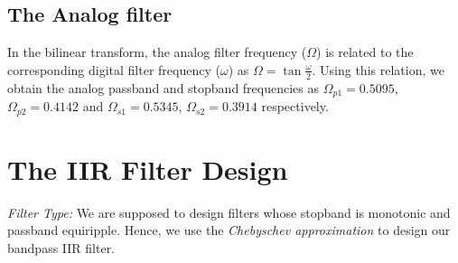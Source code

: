 \documentclass{article}
\begin{document}
\subsection{The Analog filter}
In the bilinear transform, the analog filter frequency ($\Omega$) is related to the corresponding digital filter frequency ($\omega$) as $\Omega = \tan \frac{\omega}{2}$.  Using this relation, we obtain the analog passband and stopband frequencies as $\Omega_{p1} = 0.5095$, $\Omega_{p2} = 0.4142$ and $\Omega_{s1} = 0.5345$, $\Omega_{s2} = 0.3914$
respectively.

\section{The IIR Filter Design}
{\em Filter Type:}  We are supposed to design filters whose stopband is monotonic and passband equiripple.  
Hence, we use the {\em Chebyschev approximation} to design our bandpass IIR filter.
\end{document}
